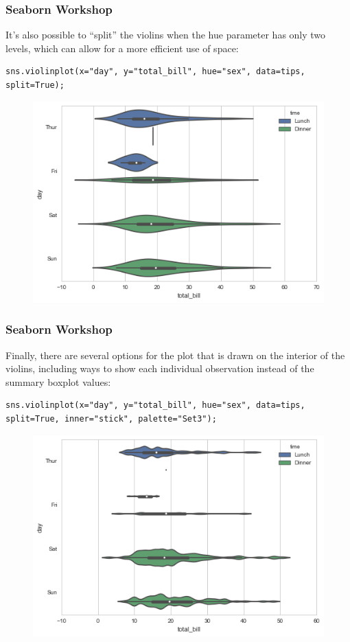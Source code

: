 \documentclass{beamer}
\begin{document}
\begin{frame}[fragile]
\frametitle{Seaborn Workshop}
\large It’s also possible to “split” the violins when the hue parameter has only two levels, which can allow for a more efficient use of space:
\begin{verbatim}
sns.violinplot(x="day", y="total_bill", hue="sex", data=tips, split=True);
\end{verbatim}
\begin{figure}
\centering
\includegraphics[width=0.7\linewidth]{images/categorical_23_0}
\caption{}
\label{fig:categorical_23_0}
\end{figure}

\end{frame}
\begin{frame}[fragile]
	\frametitle{Seaborn Workshop}
Finally, there are several options for the plot that is drawn on the interior of the violins, including ways to show each individual observation instead of the summary boxplot values:
\begin{verbatim}
sns.violinplot(x="day", y="total_bill", hue="sex", data=tips,
split=True, inner="stick", palette="Set3");
\end{verbatim}

\begin{figure}
	\centering
	\includegraphics[width=0.7\linewidth]{images/categorical_25_0}
\end{figure}
\end{frame}
\end{document}
